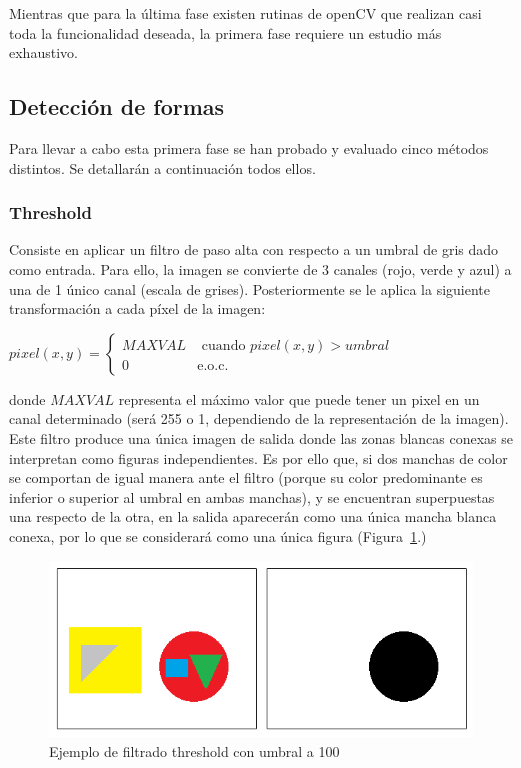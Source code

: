 {	Mientras que para la última fase existen rutinas de openCV que realizan casi toda la funcionalidad deseada, la primera fase requiere un estudio más exhaustivo.\\
	
	\subsection{Detección de formas}
	
	Para llevar a cabo esta primera fase se han probado y evaluado cinco métodos distintos. Se detallarán a continuación todos ellos.
	
	\subsubsection{Threshold}
	
	Consiste en aplicar un filtro de paso alta con respecto a un umbral de gris dado como entrada. Para ello, la imagen se convierte de 3 canales (rojo, verde y azul) a una de 1 único canal (escala de grises). Posteriormente se le aplica la siguiente transformación a cada píxel de la imagen:

	\begin{center}
		$pixel(x,y) = \left\{
		\begin{array}{cc}
		MAXVAL 	& \text{ cuando } pixel(x,y) > umbral\\ 
		0 	    & 	\text{e.o.c.}
		\end{array}\right.$
	\end{center}

	donde $MAXVAL$ representa el máximo valor que puede tener un pixel en un canal determinado (será 255 o 1, dependiendo de la representación de la imagen).\\
	
	Este filtro produce una única imagen de salida donde las zonas blancas conexas se interpretan como figuras independientes. Es por ello que, si dos manchas de color se comportan de igual manera ante el filtro (porque su color predominante es inferior o superior al umbral en ambas manchas), y se encuentran superpuestas una respecto de la otra, en la salida aparecerán como una única mancha blanca conexa, por lo que se considerará como una única figura (Figura~\ref{fig:threshold1}.)\\
	
		\begin{figure}[htbp]
		\centering
		\includegraphics[scale=0.47]{graphics/threshold1.png}
		\caption{Ejemplo de filtrado threshold con umbral a 100}
		\label{fig:threshold1}
		\end{figure}
		
}
